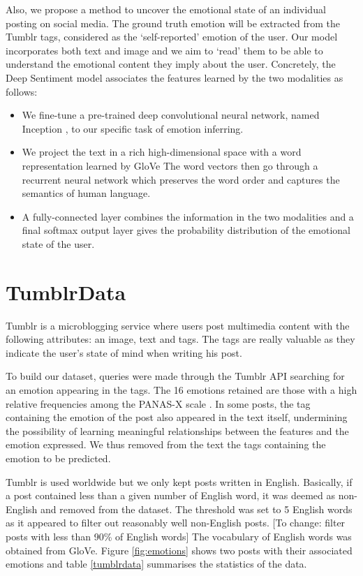 \documentclass{article} %
\begin{document}
Also, we propose a method to uncover the emotional state of an individual posting on social media. The ground truth emotion will be extracted from the Tumblr tags, considered as the `self-reported' emotion of the user. Our model incorporates both text and image and we aim to `read' them to be able to understand the emotional content they imply about the user. Concretely, the Deep Sentiment model associates the features learned by the two modalities as follows:

\begin{itemize}
    \item We fine-tune a pre-trained deep convolutional neural network, named Inception \citep{Szegedy-15}, to our specific task of emotion inferring.
    \item We project the text in a rich high-dimensional space with a word representation learned by GloVe \citep{Pennington-14} The word vectors then go through a recurrent neural network which preserves the word order and captures the semantics of human language.
    \item A fully-connected layer combines the information in the two modalities and a final softmax output layer gives the probability distribution of the emotional state of the user.
\end{itemize}


\section{TumblrData}

Tumblr is a microblogging service where users post multimedia content with the following attributes: an image, text and tags. The tags are really valuable as they indicate the user's state of mind when writing his post. 

To build our dataset, queries were made through the Tumblr API searching for an emotion appearing in the tags. The 16 emotions retained are those with a high relative frequencies among the PANAS-X scale \citep{PANAS-X}. In some posts, the tag containing the emotion of the post also appeared in the text itself, undermining the possibility of learning meaningful relationships between the features and the emotion expressed. We thus removed from the text the tags containing the emotion to be predicted.

Tumblr is used worldwide but we only kept posts written in English. Basically, if a post contained less than a given number of English word, it was deemed as non-English and removed from the dataset. The threshold was set to 5 English words as it appeared to filter out reasonably well non-English posts. [To change: filter posts with less than 90\% of English words] The vocabulary of English words was obtained from GloVe. Figure \ref{fig:emotions} shows two posts with their associated emotions and table \ref{tumblrdata} summarises the statistics of the data.
\end{document}

